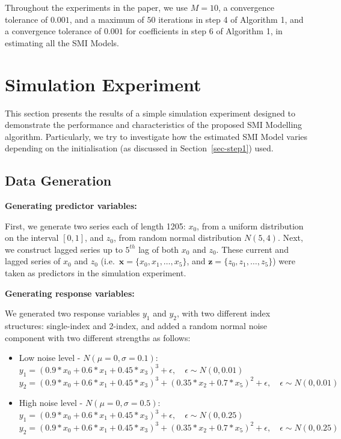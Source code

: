 \documentclass[11pt,a4paper,]{article}
\begin{document}
Throughout the experiments in the paper, we use \(M = 10\), a
convergence tolerance of \(0.001\), and a maximum of \(50\) iterations
in step 4 of Algorithm 1, and a convergence tolerance of \(0.001\) for
coefficients in step 6 of Algorithm 1, in estimating all the SMI Models.

\hypertarget{sec-simulation}{%
\section{Simulation Experiment}\label{sec-simulation}}

This section presents the results of a simple simulation experiment
designed to demonstrate the performance and characteristics of the
proposed SMI Modelling algorithm. Particularly, we try to investigate
how the estimated SMI Model varies depending on the initialisation (as
discussed in Section~\ref{sec-step1}) used.

\hypertarget{sec-datagen}{%
\subsection{Data Generation}\label{sec-datagen}}

\textbf{Generating predictor variables:}

First, we generate two series each of length 1205: \(x_{0}\), from a
uniform distribution on the interval \([0, 1]\), and \(z_{0}\), from
random normal distribution \(N(5, 4)\). Next, we construct lagged series
up to \(5^{th}\) lag of both \(x_{0}\) and \(z_{0}\). These current and
lagged series of \(x_{0}\) and \(z_{0}\)
(i.e.~\(\bm{x} = \{x_{0}, x_{1}, \dots, x_{5}\}\), and
\(\bm{z} = \{z_{0}, z_{1}, \dots, z_{5}\}\)) were taken as predictors in
the simulation experiment.

\textbf{Generating response variables:}

We generated two response variables \(y_{1}\) and \(y_{2}\), with two
different index structures: single-index and 2-index, and added a random
normal noise component with two different strengths as follows:

\begin{itemize}
\item
  Low noise level - \(N(\mu = 0, \sigma = 0.1)\):\\
  \(y_{1} = (0.9*x_{0} + 0.6*x_{1} + 0.45*x_{3})^3 + \epsilon, \quad \epsilon\sim N(0, 0.01)\)\\
  \(y_{2} = (0.9*x_{0} + 0.6*x_{1} + 0.45*x_{3})^3 + (0.35*x_{2} + 0.7*x_{5})^2 + \epsilon, \quad \epsilon\sim N(0, 0.01)\)
\item
  High noise level - \(N(\mu = 0, \sigma = 0.5)\):\\
  \(y_{1} = (0.9*x_{0} + 0.6*x_{1} + 0.45*x_{3})^3 + \epsilon, \quad \epsilon\sim N(0, 0.25)\)\\
  \(y_{2} = (0.9*x_{0} + 0.6*x_{1} + 0.45*x_{3})^3 + (0.35*x_{2} + 0.7*x_{5})^2 + \epsilon, \quad \epsilon\sim N(0, 0.25)\)
\end{itemize}
\end{document}
